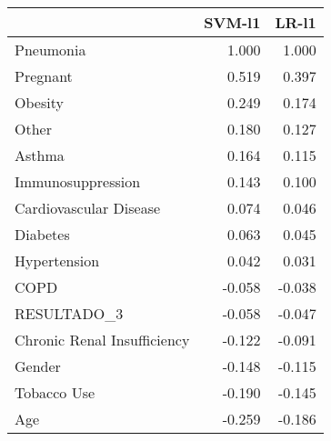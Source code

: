 \begin{tabular}{lrr}
\toprule
{} &  SVM-l1 &  LR-l1 \\
\midrule
Pneumonia                   &   1.000 &  1.000 \\
Pregnant                    &   0.519 &  0.397 \\
Obesity                     &   0.249 &  0.174 \\
Other                       &   0.180 &  0.127 \\
Asthma                      &   0.164 &  0.115 \\
Immunosuppression           &   0.143 &  0.100 \\
Cardiovascular Disease      &   0.074 &  0.046 \\
Diabetes                    &   0.063 &  0.045 \\
Hypertension                &   0.042 &  0.031 \\
COPD                        &  -0.058 & -0.038 \\
RESULTADO\_3                 &  -0.058 & -0.047 \\
Chronic Renal Insufficiency &  -0.122 & -0.091 \\
Gender                      &  -0.148 & -0.115 \\
Tobacco Use                 &  -0.190 & -0.145 \\
Age                         &  -0.259 & -0.186 \\
\bottomrule
\end{tabular}
